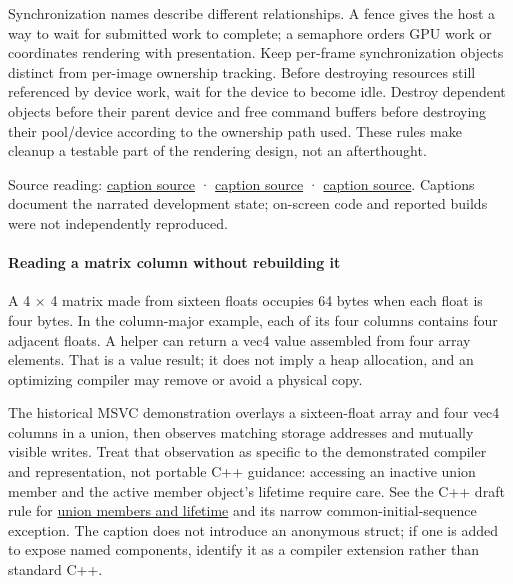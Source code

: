 Synchronization names describe different relationships. A fence gives the host a way to wait for submitted work to complete; a semaphore orders GPU work or coordinates rendering with presentation. Keep per-frame synchronization objects distinct from per-image ownership tracking. Before destroying resources still referenced by device work, wait for the device to become idle. Destroy dependent objects before their parent device and free command buffers before destroying their pool/device according to the ownership path used. These rules make cleanup a testable part of the rendering design, not an afterthought.

Source reading: \href{https://www.youtube.com/watch?v=70q9jtjWP4o}{caption source} · \href{https://www.youtube.com/watch?v=4M1hKSFxhWw}{caption source} · \href{https://www.youtube.com/watch?v=Is6CwlsaCFE}{caption source}. Captions document the narrated development state; on-screen code and reported builds were not independently reproduced.

\paragraph{Reading a matrix column without rebuilding it}\label{06-engine-ii-ch025-reading-a-matrix-column-without-rebuilding-it}

\hypertarget{06-engine-ii-ch025-reading-a-matrix-column-without-rebuilding-it}{}

A 4 × 4 matrix made from sixteen floats occupies 64 bytes when each float is four bytes. In the column-major example, each of its four columns contains four adjacent floats. A  helper can return a vec4 value assembled from four array elements. That is a value result; it does not imply a heap allocation, and an optimizing compiler may remove or avoid a physical copy.

The historical MSVC demonstration overlays a sixteen-float array and four vec4 columns in a union, then observes matching storage addresses and mutually visible writes. Treat that observation as specific to the demonstrated compiler and representation, not portable C++ guidance: accessing an inactive union member and the active member object's lifetime require care. See the C++ draft rule for \href{https://eel.is/c++draft/class.union}{union members and lifetime} and its narrow common-initial-sequence exception. The caption does not introduce an anonymous struct; if one is added to expose named components, identify it as a compiler extension rather than standard C++.

